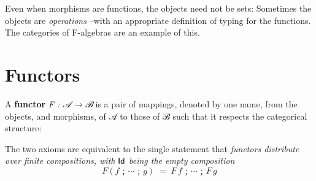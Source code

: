 \documentclass[11pt]{article}
\begin{document}
\room

Even when morphisms are functions, the objects need not be sets:
Sometimes the objects are \emph{operations} --with an appropriate definition
of typing for the functions. The categories of F-algebras are an example
of this.


\newpage

\section{Functors}
\label{sec:orgb6f2bb8}

A \textbf{functor} \emph{F : 𝒜 → ℬ} is a pair of mappings, denoted by one name,
from the objects, and morphisms, of 𝒜 to those of ℬ such that
it respects the categorical structure:

{\setlength{\abovedisplayskip}{-1pt}\setlength{\belowdisplayskip}{-1pt}




}

\vspace{1em}

The two axioms are equivalent to the single statement that 
\emph{functors distribute over finite compositions, with \(\mathsf{Id}\) being the empty composition}
\[ F(f ﹔ \cdots ﹔ g) \;=\; F\, f ﹔ \cdots ﹔ F\, g \]
\end{document}

